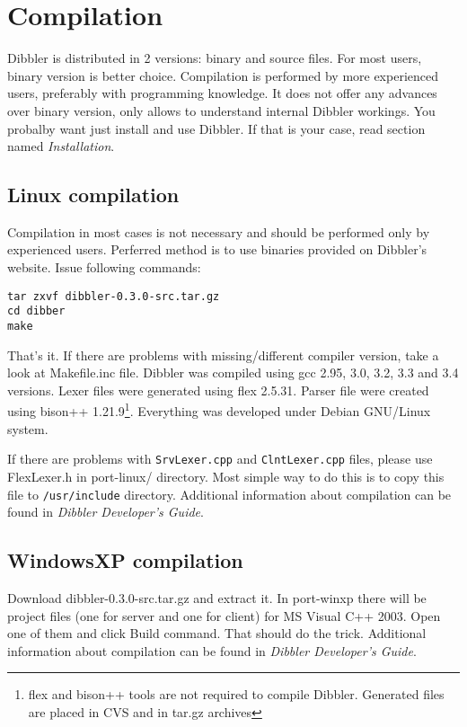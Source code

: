 \section{Compilation}
Dibbler is distributed in 2 versions: binary and source files. For
most users, binary version is better choice.  Compilation is
performed by more experienced users, preferably with programming
knowledge. It does not offer any advances over binary version, only
allows to understand internal Dibbler workings. You probalby want just
install and use Dibbler. If that is your case, read section
named \emph{Installation}.

\subsection{Linux compilation}

Compilation in most cases is not necessary and should be performed
only by experienced users. Perferred method is to use binaries
provided on Dibbler's website. Issue following commands:
\begin{verbatim}
tar zxvf dibbler-0.3.0-src.tar.gz
cd dibber
make
\end{verbatim}
That's it. If there are problems with missing/different compiler
version, take a look at Makefile.inc file. Dibbler was compiled using
gcc 2.95, 3.0, 3.2, 3.3 and 3.4 versions. Lexer files were generated using
flex 2.5.31. Parser file were created using bison++
1.21.9\footnote{flex and bison++ tools are not required to compile
  Dibbler. Generated files are placed in CVS and in tar.gz
  archives}. Everything was developed under Debian GNU/Linux system.

If there are problems with \verb+SrvLexer.cpp+ and
\verb+ClntLexer.cpp+ files, please use FlexLexer.h in port-linux/
directory. Most simple way to do this is to copy this file to
\verb+/usr/include+ directory. Additional information about
compilation can be found in \emph{Dibbler Developer's Guide}.

\subsection{WindowsXP compilation}
Download dibbler-0.3.0-src.tar.gz and extract it. In port-winxp there
will be project files (one for server and one for client) for MS
Visual C++ 2003. Open one of them and click Build command. That should
do the trick. Additional information about compilation can be found in
\emph{Dibbler Developer's Guide}.
